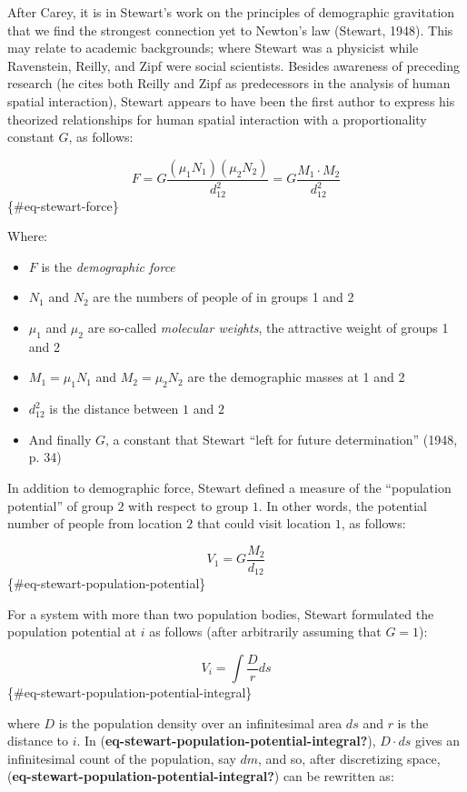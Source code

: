 \documentclass[
11pt, %
oneside, %
english, %
singlespacing, %
]{macthesis} %
\def\tightlist{}
\begin{document}
After Carey, it is in Stewart's work on the principles of demographic gravitation that we find the strongest connection yet to Newton's law (Stewart, 1948). This may relate to academic backgrounds; where Stewart was a physicist while Ravenstein, Reilly, and Zipf were social scientists. Besides awareness of preceding research (he cites both Reilly and Zipf as predecessors in the analysis of human spatial interaction), Stewart appears to have been the first author to express his theorized relationships for human spatial interaction with a proportionality constant \(G\), as follows:

\[
F = G\frac{(\mu_1N_1)(\mu_2N_2)}{d_{12}^2} = G\frac{M_1\cdot M_2}{d_{12}^2} 
\] \{\#eq-stewart-force\}

\noindent Where:

\begin{itemize}
\tightlist
\item
  \(F\) is the \emph{demographic force}
\item
  \(N_1\) and \(N_2\) are the numbers of people of in groups 1 and 2
\item
  \(\mu_1\) and \(\mu_2\) are so-called \emph{molecular weights}, the attractive weight of groups 1 and 2
\item
  \(M_1 = \mu_1N_1\) and \(M_2 = \mu_2N_2\) are the demographic masses at 1 and 2
\item
  \(d_{12}^2\) is the distance between \(1\) and \(2\)
\item
  And finally \(G\), a constant that Stewart ``left for future determination'' (1948, p. 34)
\end{itemize}

In addition to demographic force, Stewart defined a measure of the ``population potential'' of group \(2\) with respect to group \(1\). In other words, the potential number of people from location \(2\) that could visit location \(1\), as follows:

\[
V_1 = G\frac{M_2}{d_{12}}
\] \{\#eq-stewart-population-potential\}

For a system with more than two population bodies, Stewart formulated the population potential at \(i\) as follows (after arbitrarily assuming that \(G=1\)):

\[
V_i = \int\frac{D}{r} ds
\] \{\#eq-stewart-population-potential-integral\}

\noindent where \(D\) is the population density over an infinitesimal area \(ds\) and \(r\) is the distance to \(i\). In (\textbf{eq-stewart-population-potential-integral?}), \(D\cdot ds\) gives an infinitesimal count of the population, say \(dm\), and so, after discretizing space, (\textbf{eq-stewart-population-potential-integral?}) can be rewritten as:
\end{document}
